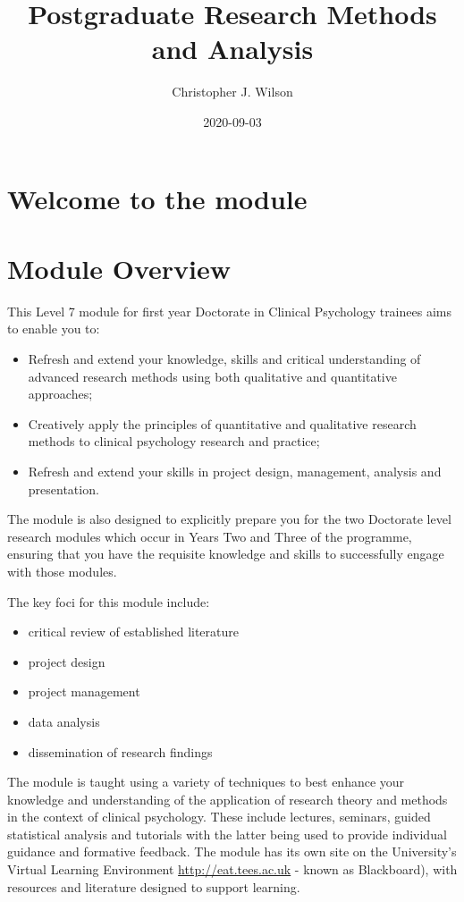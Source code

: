 \documentclass[
]{book}
\title{Postgraduate Research Methods and Analysis}
\author{Christopher J. Wilson}
\date{2020-09-03}
\providecommand{\tightlist}{%
  \setlength{\itemsep}{0pt}\setlength{\parskip}{0pt}}
\begin{document}
\maketitle

{
\setcounter{tocdepth}{1}
\tableofcontents
}
\hypertarget{welcome-to-the-module}{%
\chapter{Welcome to the module}\label{welcome-to-the-module}}

\hypertarget{module-overview}{%
\chapter{Module Overview}\label{module-overview}}

This Level 7 module for first year Doctorate in Clinical Psychology trainees aims to enable you to:

\begin{itemize}
\tightlist
\item
  Refresh and extend your knowledge, skills and critical understanding of advanced research methods using both qualitative and quantitative approaches;
\item
  Creatively apply the principles of quantitative and qualitative research methods to clinical psychology research and practice;
\item
  Refresh and extend your skills in project design, management, analysis and presentation.
\end{itemize}

The module is also designed to explicitly prepare you for the two Doctorate level research modules which occur in Years Two and Three of the programme, ensuring that you have the requisite knowledge and skills to successfully engage with those modules.

The key foci for this module include:

\begin{itemize}
\tightlist
\item
  critical review of established literature
\item
  project design
\item
  project management
\item
  data analysis
\item
  dissemination of research findings
\end{itemize}

The module is taught using a variety of techniques to best enhance your knowledge and understanding of the application of research theory and methods in the context of clinical psychology. These include lectures, seminars, guided statistical analysis and tutorials with the latter being used to provide individual guidance and formative feedback. The module has its own site on the University's Virtual Learning Environment \url{http://eat.tees.ac.uk} - known as Blackboard), with resources and literature designed to support learning.
\end{document}
